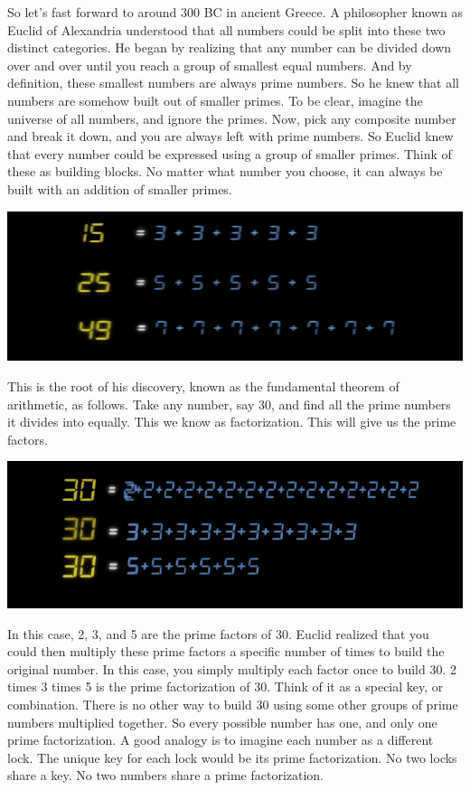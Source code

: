 \documentclass{report}
\begin{document}
So let's fast forward to around 300 BC in ancient Greece. A philosopher known as Euclid of Alexandria understood that all numbers could be split into these two distinct categories. He began by realizing that any number can be divided down over and over until you reach a group of smallest equal numbers. And by definition, these smallest numbers are always prime numbers. So he knew that all numbers are somehow built out of smaller primes. To be clear, imagine the universe of all numbers, and ignore the primes. Now, pick any composite number and break it down, and you are always left with prime numbers. So Euclid knew that every number could be expressed using a group of smaller primes. Think of these as building blocks. No matter what number you choose, it can always be built with an addition of smaller primes. 
\begin{center}
	\includegraphics[scale=1]{22.png}
\end{center}
This is the root of his discovery, known as the fundamental theorem of arithmetic, as follows. Take any number, say 30, and find all the prime numbers it divides into equally. This we know as factorization. This will give us the prime factors.
\begin{center}
	\includegraphics[scale=1]{23.png}
\end{center}
 In this case, 2, 3, and 5 are the prime factors of 30. Euclid realized that you could then multiply these prime factors a specific number of times to build the original number. In this case, you simply multiply each factor once to build 30. 2 times 3 times 5 is the prime factorization of 30. Think of it as a special key, or combination. There is no other way to build 30 using some other groups of prime numbers multiplied together. So every possible number has one, and only one prime factorization. A good analogy is to imagine each number as a different lock. The unique key for each lock would be its prime factorization. No two locks share a key. No two numbers share a prime factorization.
\end{document}
